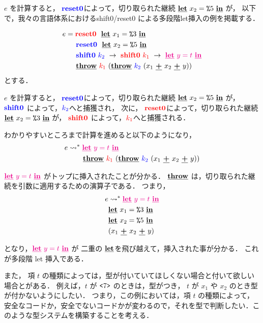 $e$ を計算すると，
$\blue{\Resetz}$によって，切り取られた継続 $\cLet~x_2=\csp{5}~\cIn$ が，
以下で，我々の言語体系におけるshift0/reset0 による多段階let挿入の例を掲載する．

\begin{align*}
    e &= \red{\Resetz} ~~\cLet~x_1=\csp{3}~\cIn \\
      &\phantom{=}~~ \blue{\Resetz} ~~\cLet~x_2=\csp{5}~\cIn \\
      &\phantom{=}~~ \blue{\Shiftz}~\blue{k_2}~\to~ \red{\Shiftz}~\red{k_1}~\to~ \magenta{\cLet~y=t~\cIn} \\
      &\phantom{=}~~ \cThrow~\red{k_1}~(\cThrow~\blue{k_2}~(x_1~\cPlus~x_2~\cPlus~y))
\end{align*}
とする．

$e$ を計算すると，
$\blue{\Resetz}$によって，切り取られた継続 $\cLet~x_2=\csp{5}~\cIn$ が，
$\blue{\Shiftz}$ によって，$\blue{k_2}$へと捕獲され，
次に，
$\red{\Resetz}$によって，切り取られた継続 $\cLet~x_2=\csp{3}~\cIn$ が，
$\red{\Shiftz}$ によって，$\red{k_1}$へと捕獲される．

わかりやすいところまで計算を進めると以下のようになり，
\begin{align*}
  e & \too \magenta{\cLet~y=t~\cIn} \\
    & \phantom{\too}~~ \cThrow~\red{k_1}~(\cThrow~\blue{k_2}~(x_1~\cPlus~x_2~\cPlus~y))
\end{align*}

$\magenta{\cLet~y=t~\cIn}$ がトップに挿入されたことが分かる．
$\cThrow$ は，切り取られた継続を引数に適用するための演算子である．
つまり，
\begin{align*}
  e & \too \magenta{\cLet~y=t~\cIn} \\
    & \cLet~x_1=\csp{3}~\cIn \\
    & \cLet~x_2=\csp{5}~\cIn \\
    & (x_1~\cPlus~x_2~\cPlus~y)
\end{align*}

となり，$\magenta{\cLet~y=t~\cIn}$ が 二重の $\cLet$を飛び越えて，挿入された事が分かる．
これが多段階 let 挿入である．

また， 項 $t$ の種類によっては，型が付いていてほしくない場合と付いて欲しい場合とがある．
例えば，$t$ が $\code{7}$ のときは，型がつき，
$t$ が $x_1$ や $x_2$ のとき型が付かないようにしたい．
つまり，この例においては，項 $t$ の種類によって，安全なコードか，安全でないコードかが変わるので，それを型で判断したい．このような型システムを構築することを考える．

